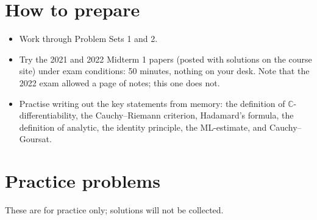 \documentclass[12pt, reqno]{amsart}
\theoremstyle{definition}
\numberwithin{equation}{subsection}
\newcommand{\C}{\mathbb{C}}
\begin{document}
\section*{How to prepare}
\begin{itemize}[leftmargin=*]
\item Work through Problem Sets 1 and 2.
\item Try the 2021 and 2022 Midterm 1 papers (posted with solutions on the course site) under exam conditions: 50 minutes,
      nothing on your desk. Note that the 2022 exam allowed a page of notes; this one does not.
\item Practise writing out the key statements from memory: the definition of $\C$-differentiability,
      the Cauchy--Riemann criterion, Hadamard's formula, the definition of analytic, the identity principle, the ML-estimate,
      and Cauchy--Goursat.
\end{itemize}

\section*{Practice problems}
\noindent These are for practice only; solutions will not be collected.
\end{document}
